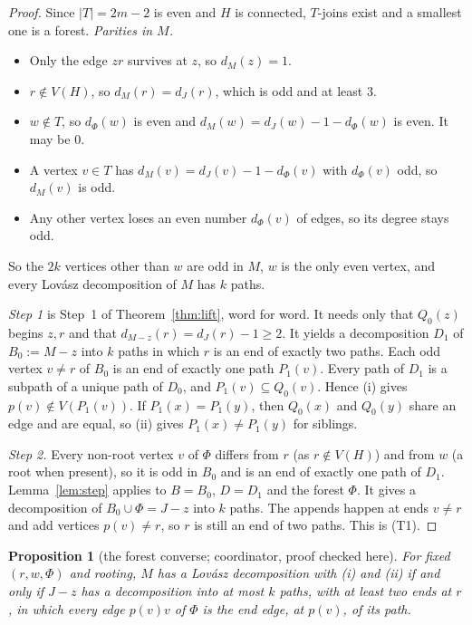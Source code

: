 \documentclass[11pt]{amsart}
\newtheorem{proposition}[theorem]{Proposition}
\theoremstyle{definition}
\begin{document}
\begin{proof}
Since $|T|=2m-2$ is even and $H$ is connected, $T$-joins exist and a smallest one is a forest.
\emph{Parities in $M$.}
\begin{itemize}[leftmargin=*]
\item Only the edge $zr$ survives at $z$, so $d_M(z)=1$.
\item $r\notin V(H)$, so $d_M(r)=d_J(r)$, which is odd and at least $3$.
\item $w\notin T$, so $d_\Phi(w)$ is even and $d_M(w)=d_J(w)-1-d_\Phi(w)$ is even. It may be $0$.
\item A vertex $v\in T$ has $d_M(v)=d_J(v)-1-d_\Phi(v)$ with $d_\Phi(v)$ odd, so $d_M(v)$ is odd.
\item Any other vertex loses an even number $d_\Phi(v)$ of edges, so its degree stays odd.
\end{itemize}
So the $2k$ vertices other than $w$ are odd in $M$, $w$ is the only even vertex, and every Lov\'asz
decomposition of $M$ has $k$ paths.

\emph{Step 1} is Step~1 of Theorem~\ref{thm:lift}, word for word. It needs only that $Q_0(z)$ begins
$z,r$ and that $d_{M-z}(r)=d_J(r)-1\ge 2$. It yields a decomposition $D_1$ of $B_0:=M-z$ into $k$
paths in which $r$ is an end of exactly two paths. Each odd vertex $v\ne r$ of $B_0$ is an end of
exactly one path $P_1(v)$. Every path of $D_1$ is a subpath of a unique path of $D_0$, and
$P_1(v)\subseteq Q_0(v)$. Hence (i) gives $p(v)\notin V(P_1(v))$. If $P_1(x)=P_1(y)$, then $Q_0(x)$
and $Q_0(y)$ share an edge and are equal, so (ii) gives $P_1(x)\ne P_1(y)$ for siblings.

\emph{Step 2.} Every non-root vertex $v$ of $\Phi$ differs from $r$ (as $r\notin V(H)$) and from $w$
(a root when present), so it is odd in $B_0$ and is an end of exactly one path of $D_1$. Lemma~\ref{lem:step}
applies to $B=B_0$, $D=D_1$ and the forest $\Phi$. It gives a decomposition of $B_0\cup\Phi=J-z$ into
$k$ paths. The appends happen at ends $v\ne r$ and add vertices $p(v)\ne r$, so $r$ is still an end of
two paths. This is (T1).
\end{proof}

\begin{proposition}[the forest converse; coordinator, proof checked here]\label{prop:forestconv}
For fixed $(r,w,\Phi)$ and rooting, $M$ has a Lov\'asz decomposition with (i) and (ii) if and only if
$J-z$ has a decomposition into at most $k$ paths, with at least two ends at $r$, in which every edge
$p(v)v$ of $\Phi$ is the end edge, at $p(v)$, of its path.
\end{proposition}
\end{document}
